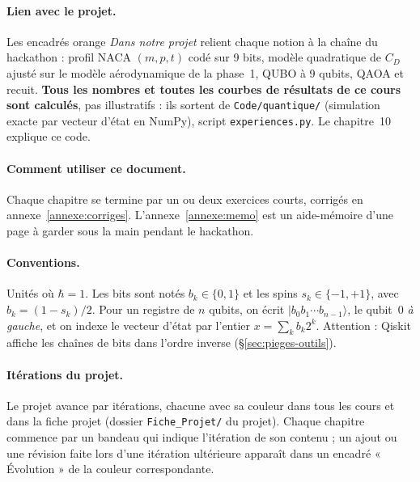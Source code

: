 \documentclass[11pt,a4paper]{report}
\newcommand{\ket}[1]{\lvert #1\rangle}
\begin{document}
\paragraph{Lien avec le projet.} Les encadrés orange \emph{Dans notre projet} relient chaque notion à la chaîne du hackathon : profil NACA $(m,p,t)$ codé sur 9 bits, modèle quadratique de $C_D$ ajusté sur le modèle aérodynamique de la phase~1, QUBO à 9 qubits, QAOA et recuit. \textbf{Tous les nombres et toutes les courbes de résultats de ce cours sont calculés}, pas illustratifs : ils sortent de \texttt{Code/quantique/} (simulation exacte par vecteur d'état en NumPy), script \texttt{experiences.py}. Le chapitre~10 explique ce code.

\paragraph{Comment utiliser ce document.} Chaque chapitre se termine par un ou deux exercices courts, corrigés en annexe~\ref{annexe:corriges}. L'annexe~\ref{annexe:memo} est un aide-mémoire d'une page à garder sous la main pendant le hackathon.

\paragraph{Conventions.} Unités où $\hbar=1$. Les bits sont notés $b_k\in\{0,1\}$ et les spins $s_k\in\{-1,+1\}$, avec $b_k=(1-s_k)/2$. Pour un registre de $n$ qubits, on écrit $\ket{b_0b_1\cdots b_{n-1}}$, le qubit~0 \emph{à gauche}, et on indexe le vecteur d'état par l'entier $x=\sum_k b_k2^k$. Attention : Qiskit affiche les chaînes de bits dans l'ordre inverse (§\ref{sec:pieges-outils}).

\paragraph{Itérations du projet.} Le projet avance par itérations, chacune avec sa couleur dans tous les cours et dans la fiche projet (dossier \texttt{Fiche\_Projet/} du projet). Chaque chapitre commence par un bandeau qui indique l'itération de son contenu ; un ajout ou une révision faite lors d'une itération ultérieure apparaît dans un encadré « Évolution » de la couleur correspondante.
\legendeiterations

\tableofcontents
\cleardoublepage
{}


















\appendix



\end{document}

